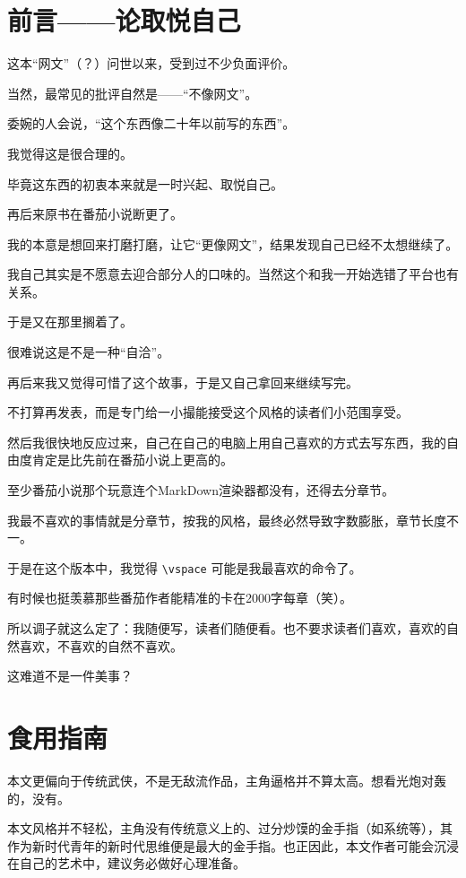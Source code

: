 \chapter{前言——论取悦自己}

这本“网文”（？）问世以来，受到过不少负面评价。

当然，最常见的批评自然是——“不像网文”。

委婉的人会说，“这个东西像二十年以前写的东西”。

我觉得这是很合理的。

毕竟这东西的初衷本来就是一时兴起、取悦自己。

再后来原书在番茄小说断更了。

我的本意是想回来打磨打磨，让它“更像网文”，结果发现自己已经不太想继续了。

我自己其实是不愿意去迎合部分人的口味的。当然这个和我一开始选错了平台也有关系。

于是又在那里搁着了。

很难说这是不是一种“自洽”。

再后来我又觉得可惜了这个故事，于是又自己拿回来继续写完。

不打算再发表，而是专门给一小撮能接受这个风格的读者们小范围享受。

然后我很快地反应过来，自己在自己的电脑上用自己喜欢的方式去写东西，我的自由度肯定是比先前在番茄小说上更高的。

至少番茄小说那个玩意连个MarkDown渲染器都没有，还得去分章节。

我最不喜欢的事情就是分章节，按我的风格，最终必然导致字数膨胀，章节长度不一。

于是在这个版本中，我觉得 \verb|\vspace| 可能是我最喜欢的命令了。

有时候也挺羡慕那些番茄作者能精准的卡在2000字每章（笑）。

所以调子就这么定了：我随便写，读者们随便看。也不要求读者们喜欢，喜欢的自然喜欢，不喜欢的自然不喜欢。

这难道不是一件美事？

\chapter{食用指南}

本文更偏向于传统武侠，不是无敌流作品，主角逼格并不算太高。想看光炮对轰的，没有。

本文风格并不轻松，主角没有传统意义上的、过分炒馍的金手指（如系统等），其作为新时代青年的新时代思维便是最大的金手指。也正因此，本文作者可能会沉浸在自己的艺术中，建议务必做好心理准备。